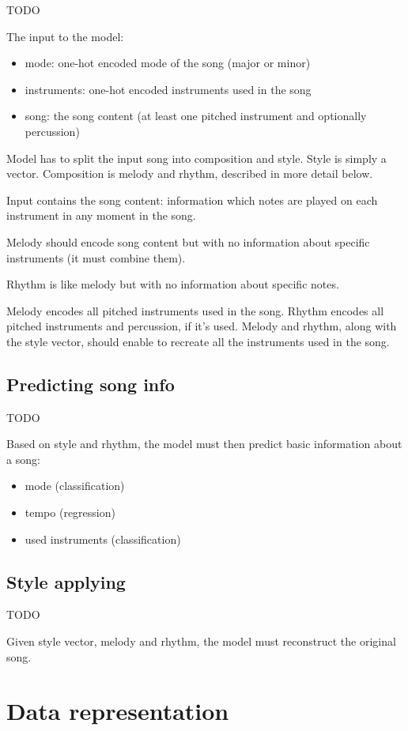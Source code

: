 \documentclass[en]{pracamgr}
\begin{document}
TODO

The input to the model:
\begin{itemize}
\item mode: one-hot encoded mode of the song (major or minor)
\item instruments: one-hot encoded instruments used in the song
\item song: the song content (at least one pitched instrument and optionally percussion)
\end{itemize}
Model has to split the input song into composition and style.
Style is simply a vector. Composition is melody and rhythm, described in more detail below.

Input contains the song content: information which notes are played on each instrument in any moment in the song.

Melody should encode song content but with no information about specific instruments (it must combine them).

Rhythm is like melody but with no information about specific notes.

Melody encodes all pitched instruments used in the song.
Rhythm encodes all pitched instruments and percussion, if it's used.
Melody and rhythm, along with the style vector, should enable to recreate all the instruments used in the song.

\section{Predicting song info}

TODO

Based on style and rhythm, the model must then predict basic information about a song:
\begin{itemize}
\item mode (classification)
\item tempo (regression)
\item used instruments (classification)
\end{itemize}

\section{Style applying}

TODO

Given style vector, melody and rhythm, the model must reconstruct the original song.

\chapter{Data representation}
\end{document}
